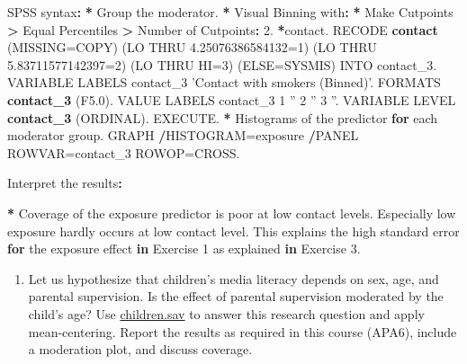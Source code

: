 \documentclass[a4paper]{book}
\newenvironment{Shaded}{\begin{snugshade}}{\end{snugshade}}
\newcommand{\KeywordTok}[1]{\textcolor[rgb]{0,0,0}{\textbf{#1}}}
\newcommand{\DataTypeTok}[1]{\textcolor[rgb]{0,0,0}{#1}}
\newcommand{\DecValTok}[1]{\textcolor[rgb]{0.00,0.00,0.00}{#1}}
\newcommand{\FloatTok}[1]{\textcolor[rgb]{0.00,0.00,0.00}{#1}}
\newcommand{\StringTok}[1]{\textcolor[rgb]{0.00,0.00,0.00}{#1}}
\newcommand{\ControlFlowTok}[1]{\textcolor[rgb]{0.00,0.00,0.00}{\textbf{#1}}}
\newcommand{\OperatorTok}[1]{\textcolor[rgb]{0.00,0.00,0.00}{\textbf{#1}}}
\newcommand{\ErrorTok}[1]{\textcolor[rgb]{0.00,0.00,0.00}{\textbf{#1}}}
\newcommand{\NormalTok}[1]{#1}
\providecommand{\tightlist}{%
  \setlength{\itemsep}{0pt}\setlength{\parskip}{0pt}}
\theoremstyle{definition}
\theoremstyle{definition}
\theoremstyle{definition}
\theoremstyle{remark}
\begin{document}
\begin{Shaded}
\begin{Highlighting}[]
\NormalTok{SPSS syntax}\OperatorTok{:}\StringTok{  }
\StringTok{  }
\ErrorTok{*}\StringTok{ }\NormalTok{Group the moderator.  }
\OperatorTok{*}\StringTok{ }\NormalTok{Visual Binning with}\OperatorTok{:}
\ErrorTok{*}\StringTok{ }\NormalTok{Make Cutpoints }\OperatorTok{>}\StringTok{ }\NormalTok{Equal Percentiles }\OperatorTok{>}\StringTok{ }\NormalTok{Number of Cutpoints}\OperatorTok{:}\StringTok{ }\DecValTok{2}\NormalTok{.}
\OperatorTok{*}\NormalTok{contact.  }
\NormalTok{RECODE  }\KeywordTok{contact}\NormalTok{ (}\DataTypeTok{MISSING=}\NormalTok{COPY)  }
\NormalTok{  (LO THRU }\FloatTok{4.25076386584132}\NormalTok{=}\DecValTok{1}\NormalTok{)  }
\NormalTok{  (LO THRU }\FloatTok{5.83711577142397}\NormalTok{=}\DecValTok{2}\NormalTok{)   }
\NormalTok{  (LO THRU }\DataTypeTok{HI=}\DecValTok{3}\NormalTok{) (}\DataTypeTok{ELSE=}\NormalTok{SYSMIS) INTO contact_}\DecValTok{3}\NormalTok{.  }
\NormalTok{VARIABLE LABELS  contact_}\DecValTok{3} \StringTok{'Contact with smokers (Binned)'}\NormalTok{.  }
\NormalTok{FORMATS  }\KeywordTok{contact_3}\NormalTok{ (F5.}\DecValTok{0}\NormalTok{).  }
\NormalTok{VALUE LABELS  contact_}\DecValTok{3} \DecValTok{1} \StringTok{''} \DecValTok{2} \StringTok{''} \DecValTok{3} \StringTok{''}\NormalTok{.  }
\NormalTok{VARIABLE LEVEL  }\KeywordTok{contact_3}\NormalTok{ (ORDINAL).  }
\NormalTok{EXECUTE.  }
\OperatorTok{*}\StringTok{ }\NormalTok{Histograms of the predictor }\ControlFlowTok{for}\NormalTok{ each moderator group.  }
\NormalTok{GRAPH  }
  \OperatorTok{/}\NormalTok{HISTOGRAM=exposure  }
  \OperatorTok{/}\NormalTok{PANEL ROWVAR=contact_}\DecValTok{3}\NormalTok{ ROWOP=CROSS.  }
  
\NormalTok{Interpret the results}\OperatorTok{:}\StringTok{  }

\ErrorTok{*}\StringTok{ }\NormalTok{Coverage of the exposure predictor is poor at low contact levels. Especially}
\NormalTok{low exposure hardly occurs at low contact level. This explains the high}
\NormalTok{standard error }\ControlFlowTok{for}\NormalTok{ the exposure effect }\ControlFlowTok{in}\NormalTok{ Exercise }\DecValTok{1}\NormalTok{ as explained }\ControlFlowTok{in}\NormalTok{ Exercise}
\DecValTok{3}\NormalTok{.}
\end{Highlighting}
\end{Shaded}

\begin{enumerate}
\def\labelenumi{\arabic{enumi}.}
\setcounter{enumi}{4}
\tightlist
\item
  Let us hypothesize that children's media literacy depends on sex, age,
  and parental supervision. Is the effect of parental supervision
  moderated by the child's age? Use
  \href{http://82.196.4.233:3838/data/children.sav}{children.sav} to
  answer this research question and apply mean-centering. Report the
  results as required in this course (APA6), include a moderation plot,
  and discuss coverage.
\end{enumerate}
\end{document}

